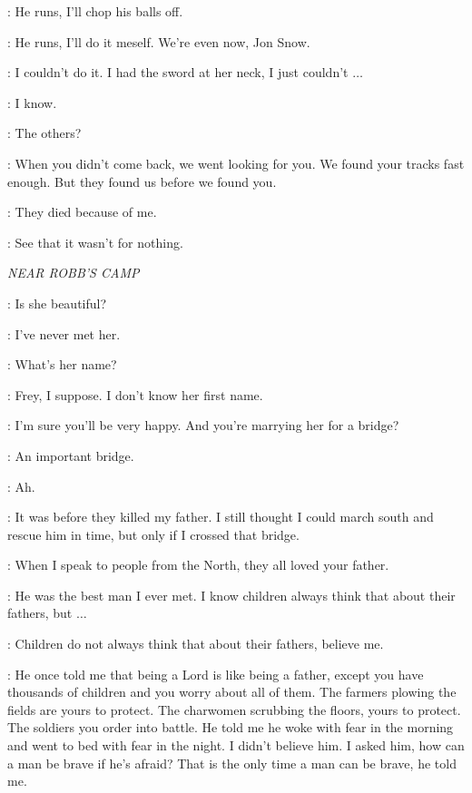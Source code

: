 \LORDOFBONES: He runs, I'll chop his balls off. 

\YGRITTE: He runs, I'll do it meself. We're even now, Jon Snow. 


\JON: I couldn't do it. I had the sword at her neck, I just couldn't $\ldots$  

\HALFHAND: I know. 

\JON: The others? 

\HALFHAND: When you didn't come back, we went looking for you. We found your tracks fast enough. But they found us before we found you. 

\JON: They died because of me. 

\HALFHAND: See that it wasn't for nothing. 


\scene

\textit{NEAR ROBB'S CAMP} 


\TALISA: Is she beautiful? 

\ROBB: I've never met her. 

\TALISA: What's her name? 

\ROBB: Frey, I suppose. I don't know her first name. 

\TALISA: I'm sure you'll be very happy.  And you're marrying her for a bridge? 

\ROBB: An important bridge. 

\TALISA: Ah. 

\ROBB: It was before they killed my father. I still thought I could march south and rescue him in time, but only if I crossed that bridge. 

\TALISA: When I speak to people from the North, they all loved your father. 

\ROBB: He was the best man I ever met. I know children always think that about their fathers, but $\ldots$  

\TALISA: Children do not always think that about their fathers, believe me. 

\ROBB: He once told me that being a Lord is like being a father, except you have thousands of children and you worry about all of them. The farmers plowing the fields are yours to protect. The charwomen scrubbing the floors, yours to protect. The soldiers you order into battle. He told me he woke with fear in the morning and went to bed with fear in the night. I didn't believe him. I asked him, how can a man be brave if he's afraid? That is the only time a man can be brave, he told me. 


